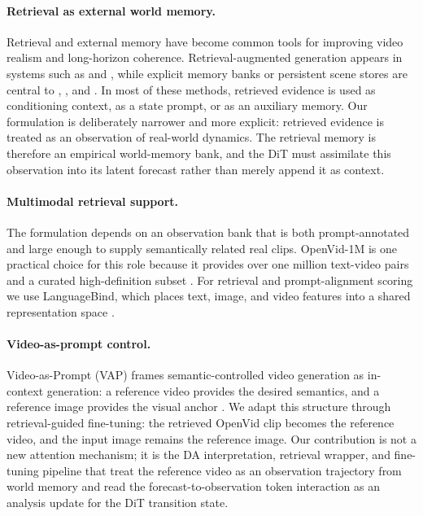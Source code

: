 \documentclass{article}
\begin{document}
\paragraph{Retrieval as external world memory.}
Retrieval and external memory have become common tools for improving video realism and long-horizon coherence. Retrieval-augmented generation appears in systems such as \citet{ragme2025} and \citet{chen2025interactiveworldmodels}, while explicit memory banks or persistent scene stores are central to \citet{worldpack2025}, \citet{evoworld2025}, and \citet{icworld2025}. In most of these methods, retrieved evidence is used as conditioning context, as a state prompt, or as an auxiliary memory. Our formulation is deliberately narrower and more explicit: retrieved evidence is treated as an observation of real-world dynamics. The retrieval memory is therefore an empirical world-memory bank, and the DiT must assimilate this observation into its latent forecast rather than merely append it as context.

\paragraph{Multimodal retrieval support.}
The formulation depends on an observation bank that is both prompt-annotated and large enough to supply semantically related real clips. OpenVid-1M is one practical choice for this role because it provides over one million text-video pairs and a curated high-definition subset \citep{openvid2025}. For retrieval and prompt-alignment scoring we use LanguageBind, which places text, image, and video features into a shared representation space \citep{languagebind2024}.

\paragraph{Video-as-prompt control.}
Video-as-Prompt (VAP) frames semantic-controlled video generation as in-context generation: a reference video provides the desired semantics, and a reference image provides the visual anchor \citep{bian2025videoasprompt}. We adapt this structure through retrieval-guided fine-tuning: the retrieved OpenVid clip becomes the reference video, and the input image remains the reference image. Our contribution is not a new attention mechanism; it is the DA interpretation, retrieval wrapper, and fine-tuning pipeline that treat the reference video as an observation trajectory from world memory and read the forecast-to-observation token interaction as an analysis update for the DiT transition state.
\end{document}
